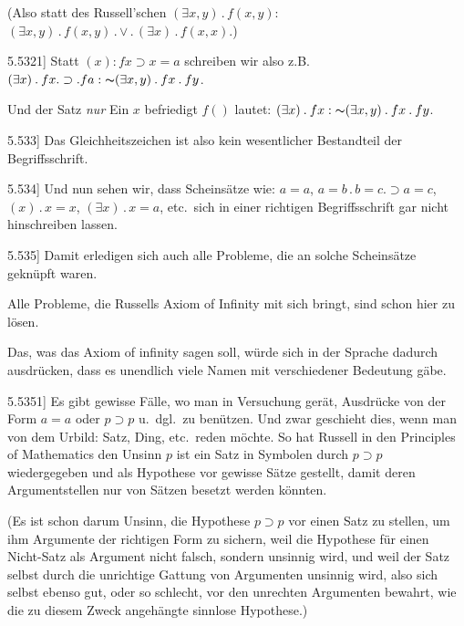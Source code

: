 \documentclass[12pt,oneside]{book}[2007/10/19]
\newcommand{\PropERef}[1]{\hyperref[PropE:#1]{#1}}
\newcommand{\PropositionG}[2]{%
  \item[\phantomsection\label{PropG:#1}\PropERef{#1}] #2%
}
\newcommand{\Not}[1]{\mathord{\thicksim} #1}
\newcommand{\DotOp}{\mathbin{.}}
\newcommand{\Implies}{\supset}
\newcommand{\Emph}[1]{\emph{#1}}%
\newcommand{\zumBeispiel}{z.\;B.}
\begin{document}
\begin{propositions}
{(Also statt des Russell'schen \glqq{}$(\exists x,y) \DotOp f(x,y)$\grqq{}:
\glqq{}$(\exists x,y) \DotOp f(x,y) \DotOp \lor \DotOp (\exists x) \DotOp f(x,x)$\grqq{}.)}


\PropositionG{5.5321}
{Statt \glqq{}$(x) : fx \Implies x = a$\grqq{} schreiben wir also \zumBeispiel\ \glqq{}$(\exists
x) \DotOp fx \DotOp \Implies \DotOp fa : \Not{(\exists x,y) \DotOp fx \DotOp fy}$\grqq{}.

Und der Satz \glqq{}\Emph{nur} Ein $x$ befriedigt $f()$\grqq{} lautet:
\glqq{}$(\exists x) \DotOp fx : \Not{(\exists x,y) \DotOp fx \DotOp fy}$\grqq{}.}


\PropositionG{5.533}
{Das Gleichheitszeichen ist also kein wesentlicher
Bestandteil der Begriffsschrift.}


\PropositionG{5.534}
{Und nun sehen wir, dass Scheinsätze wie:
\glqq{}$a = a$\grqq{}, \glqq{}$a = b \DotOp b = c \DotOp \Implies a = c$\grqq{}, \glqq{}$(x) \DotOp x = x$\grqq{}, \glqq{}$(\exists x) \DotOp
x = a$\grqq{}, etc.\ sich in einer richtigen Begriffsschrift gar
nicht hinschreiben lassen.}


\PropositionG{5.535}
{Damit erledigen sich auch alle Probleme, die
an solche Scheinsätze geknüpft waren.

Alle Probleme, die Russells \glqq{}Axiom of Infinity\grqq{}
\enlargethispage{7pt} %
mit sich bringt, sind schon hier zu lösen.

Das, was das Axiom of infinity sagen soll, würde
sich in der Sprache dadurch ausdrücken, dass es
unendlich viele Namen mit verschiedener Bedeutung
gäbe.}


\PropositionG{5.5351}
{Es gibt gewisse Fälle, wo man in Versuchung
gerät, Ausdrücke von der Form \glqq{}$a = a$\grqq{} oder \glqq{}$p \Implies p$\grqq{}
u.~dgl.\ zu benützen. Und zwar geschieht dies,
wenn man von dem Urbild: Satz, Ding, etc.\ reden
möchte. So hat Russell in den \glqq{}Principles of
Mathematics\grqq{} den Unsinn \glqq{}$p$ ist ein Satz\grqq{} in Symbolen
durch \glqq{}$p \Implies p$\grqq{} wiedergegeben und als Hypothese
vor gewisse Sätze gestellt, damit deren
Argumentstellen nur von Sätzen besetzt werden
könnten.

(Es ist schon darum Unsinn, die Hypothese
$p \Implies p$ vor einen Satz zu stellen, um ihm Argumente
der richtigen Form zu sichern, weil die Hypothese
für einen Nicht-Satz als Argument nicht falsch,
sondern unsinnig wird, und weil der Satz selbst
durch die unrichtige Gattung von Argumenten
unsinnig wird, also sich selbst ebenso gut, oder so
schlecht, vor den unrechten Argumenten bewahrt,
wie die zu diesem Zweck angehängte sinnlose
Hypothese.)}



\end{propositions}
\end{document}

